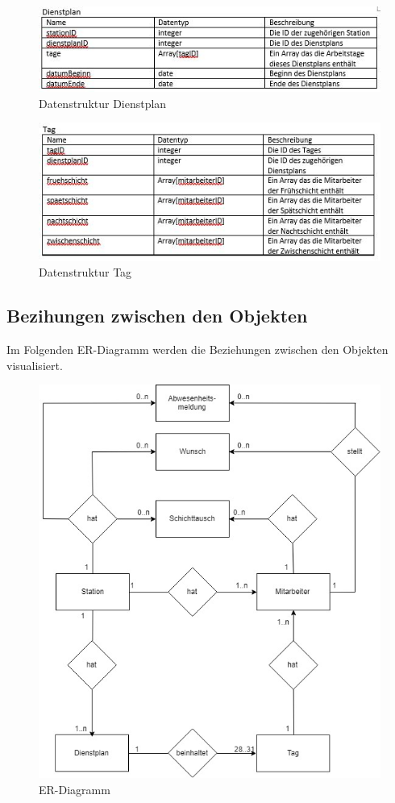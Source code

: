 \documentclass[11pt,
paper=a4,
bibtotocnumbered,	  %
liststotocnumbered,  %
DIV=calc,		  %
tablecaptionabove,	  %
headinclude,
]{article}
\begin{document}
\begin{figure}[H]
\includegraphics[width=1\textwidth]{Bilder/Ddienstplan.jpg}
\caption{Datenstruktur Dienstplan}
\end{figure}
\begin{figure}[H]
\includegraphics[width=1\textwidth]{Bilder/Dtag.jpg}
\caption{Datenstruktur Tag}
\end{figure}
\subsection{Bezihungen zwischen den Objekten}
Im Folgenden ER-Diagramm werden die Beziehungen zwischen den Objekten visualisiert.
\begin{figure}[H]
\includegraphics[width=1\textwidth]{Bilder/Er.jpg}
\caption{ER-Diagramm}
\end{figure}
\end{document}
